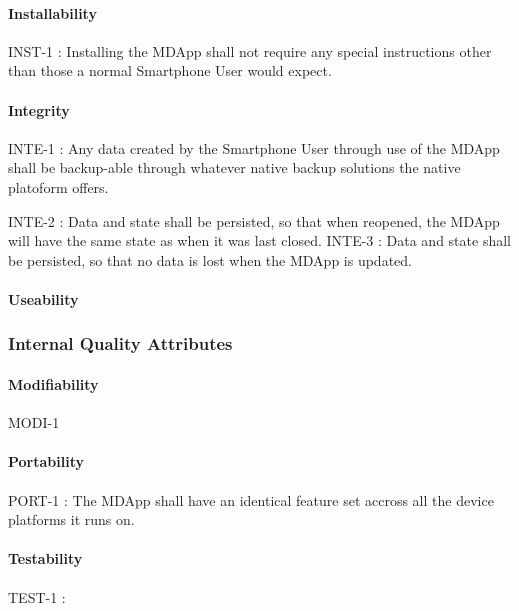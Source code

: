             \paragraph{Installability}

                INST-1 : Installing the MDApp shall not require any special instructions other than those a normal Smartphone User would expect.


            \paragraph{Integrity}

                INTE-1 : Any data created by the Smartphone User through use of the MDApp shall be backup-able through whatever native backup solutions the native platoform offers.

                INTE-2 : Data and state shall be persisted, so that when reopened, the MDApp will have the same state as when it was last closed.
                INTE-3 : Data and state shall be persisted, so that no data is lost when the MDApp is updated.

            \paragraph{Useability}

        \subsubsection{Internal Quality Attributes}

            \paragraph{Modifiability}

                MODI-1

            \paragraph{Portability}

                PORT-1 : The MDApp shall have an identical feature set accross all the device platforms it runs on.

            \paragraph{Testability}

                TEST-1 :







